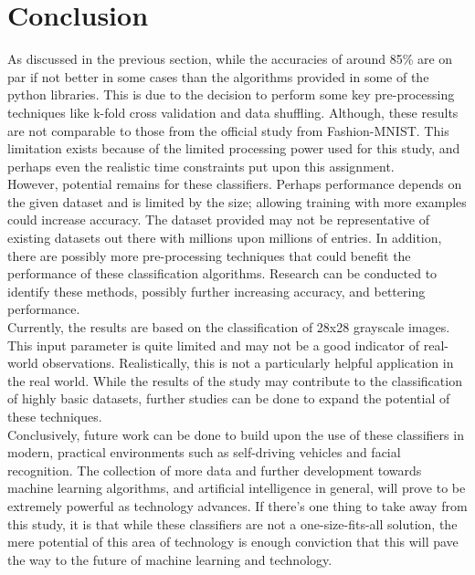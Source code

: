\documentclass[11pt,a4paper]{article}
\begin{document}
\pagebreak

\section*{Conclusion}
\noindent As discussed in the previous section, while the accuracies of around 85\% are on par if not better in some cases than the algorithms provided in some of the python libraries. This is due to the decision to perform some key pre-processing techniques like k-fold cross validation and data shuffling. Although, these results are not comparable to those from the official study from Fashion-MNIST. This limitation exists because of the limited processing power used for this study, and perhaps even the realistic time constraints put upon this assignment.\\

\noindent However, potential remains for these classifiers. Perhaps performance depends on the given dataset and is limited by the size; allowing training with more examples could increase accuracy. The dataset provided may not be representative of existing datasets out there with millions upon millions of entries. In addition, there are possibly more pre-processing techniques that could benefit the performance of these classification algorithms. Research can be conducted to identify these methods, possibly further increasing accuracy, and bettering performance.\\

\noindent Currently, the results are based on the classification of 28x28 grayscale images. This input parameter is quite limited and may not be a good indicator of real-world observations. Realistically, this is not a particularly helpful application in the real world. While the results of the study may contribute to the classification of highly basic datasets, further studies can be done to expand the potential of these techniques.\\

\noindent Conclusively, future work can be done to build upon the use of these classifiers in modern, practical environments such as self-driving vehicles and facial recognition. The collection of more data and further development towards machine learning algorithms, and artificial intelligence in general, will prove to be extremely powerful as technology advances. If there's one thing to take away from this study, it is that while these classifiers are not a one-size-fits-all solution, the mere potential of this area of technology is enough conviction that this will pave the way to the future of machine learning and technology.\\
\end{document}
